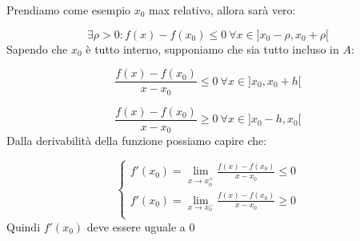 \documentclass[../analisi.tex]{subfiles}
\begin{document}
\begin{dimo}
	Prendiamo come esempio $x_0$ max relativo, allora sarà vero:

	\begin{equation}
		\exists \rho > 0: f(x)- f(x_0) \leq 0\ \forall x \in ] 
			x_0 - \rho, x_0 + \rho [
	\end{equation}
	Sapendo che $x_0$ è tutto interno, supponiamo che sia tutto incluso
	in $A$:

	\begin{equation*}
		\frac{f(x)-f(x_0)}{x - x_0} \leq 0\ \forall x \in 
		] x_0, x_0 + h [
	\end{equation*}

	\begin{equation*}
		\frac{f(x)-f(x_0)}{x - x_0} \geq 0\ \forall x \in 
		] x_0 - h, x_0 [
	\end{equation*}
	Dalla derivabilità della funzione possiamo capire che:

	\begin{equation}
		\begin{cases}
			f'(x_0)= \lim_{x \to x_0^+} \frac{f(x) - f(x_0)}{x - x_0}
				\leq 0\\
			f'(x_0)= \lim_{x \to x_0^-} \frac{f(x) - f(x_0)}{x - x_0}
				\geq 0\\
		\end{cases}
	\end{equation}
	Quindi $f'(x_0)$ deve essere uguale a $0$   
\end{dimo}


\end{document}
